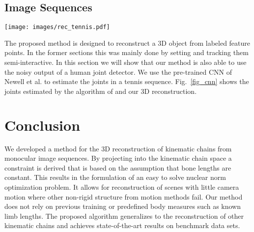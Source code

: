 \documentclass[10pt,letterpaper]{article}
\begin{document}
\subsection{Image Sequences}
\label{sec_unlabeled_sequences}
\begin{figure*}[t]
	\begin{center}
		\texttt{[image: images/rec\_tennis.pdf]}
	\end{center}
	\caption{Reconstruction of a tennis sequence automatically labeled by a CNN \cite{Newell2016}.}
	\label{fig_cnn}
\end{figure*}
The proposed method is designed to reconstruct a 3D object from labeled feature points. In the former sections this was mainly done by setting and tracking them semi-interactive. In this section we will show that our method is also able to use the noisy output of a human joint detector. We use the pre-trained CNN of Newell et al. \cite{Newell2016} to estimate the joints in a tennis sequence. Fig.~\ref{fig_cnn} shows the joints estimated by the algorithm of \cite{Newell2016} and our 3D reconstruction.

\section{Conclusion}
We developed a method for the 3D reconstruction of kinematic chains from monocular image sequences. By projecting into the kinematic chain space a constraint is derived  that is based on the assumption that bone lengths are constant. This results in the formulation of an easy to solve nuclear norm optimization problem. It allows for reconstruction of scenes with little camera motion where other non-rigid structure from motion methods fail. Our method does not rely on previous training or predefined body measures such as known limb lengths. The proposed algorithm generalizes to the reconstruction of other kinematic chains and achieves state-of-the-art results on benchmark data sets.


{\small


}
\end{document}
